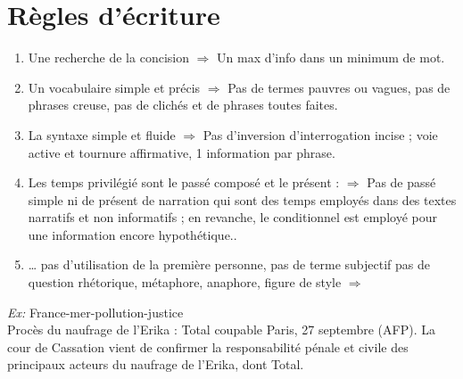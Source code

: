 \documentclass[a4paper,11pt]{report}
\begin{document}
\section{Règles d’écriture}
\begin{enumerate}
    \item  Une recherche de la concision $\Rightarrow$ Un max d’info dans un minimum de mot.
    \item  Un vocabulaire simple et précis $\Rightarrow$ Pas de termes pauvres ou vagues, pas de phrases creuse, pas de clichés et de phrases toutes faites.
    \item La syntaxe simple et fluide $\Rightarrow$ Pas d’inversion d’interrogation incise ; voie active et tournure affirmative, 1 information par phrase.
    \item Les temps privilégié sont le passé composé et le présent : $\Rightarrow$ Pas de passé simple ni de présent de narration qui sont des temps employés dans des textes narratifs et non informatifs ; en revanche, le conditionnel est employé pour une information encore hypothétique..
    \item  … pas d’utilisation de la première personne, pas de terme subjectif pas de question rhétorique, métaphore, anaphore, figure de style $\Rightarrow$
\end{enumerate}

\textit{Ex:} France-mer-pollution-justice \\
Procès du naufrage de l’Erika : Total coupable Paris, 27 septembre (AFP). La cour de Cassation vient de confirmer la responsabilité pénale et civile des principaux acteurs du naufrage de l’Erika, dont Total.
\end{document}
